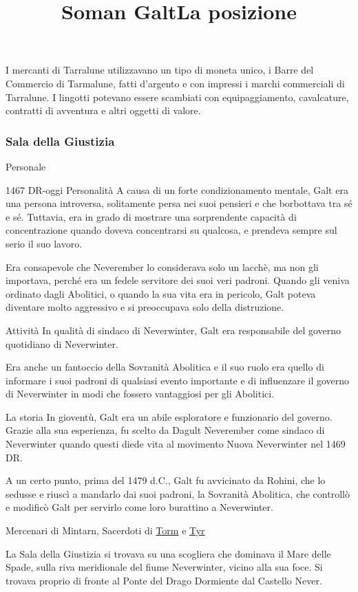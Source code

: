 \documentclass{article}
\begin{document}
I mercanti di Tarralune utilizzavano un tipo di moneta unico, i Barre del Commercio di Tarmalune, fatti d'argento e con impressi i marchi commerciali di Tarralune. I lingotti potevano essere scambiati con equipaggiamento, cavalcature, contratti di avventura e altri oggetti di valore.
\subsubsection{Sala della Giustizia}
Personale
\title{\textbf{Soman Galt}} 1467 DR-oggi\newline
Personalità
A causa di un forte condizionamento mentale, Galt era una persona introversa, solitamente persa nei suoi pensieri e che borbottava tra sé e sé. Tuttavia, era in grado di mostrare una sorprendente capacità di concentrazione quando doveva concentrarsi su qualcosa, e prendeva sempre sul serio il suo lavoro.

Era consapevole che Neverember lo considerava solo un lacchè, ma non gli importava, perché era un fedele servitore dei suoi veri padroni. Quando gli veniva ordinato dagli Abolitici, o quando la sua vita era in pericolo, Galt poteva diventare molto aggressivo e si preoccupava solo della distruzione.

Attività
In qualità di sindaco di Neverwinter, Galt era responsabile del governo quotidiano di Neverwinter.

Era anche un fantoccio della Sovranità Abolitica e il suo ruolo era quello di informare i suoi padroni di qualsiasi evento importante e di influenzare il governo di Neverwinter in modi che fossero vantaggiosi per gli Abolitici.

La storia
In gioventù, Galt era un abile esploratore e funzionario del governo. Grazie alla sua esperienza, fu scelto da Dagult Neverember come sindaco di Neverwinter quando questi diede vita al movimento Nuova Neverwinter nel 1469 DR.

A un certo punto, prima del 1479 d.C., Galt fu avvicinato da Rohini, che lo sedusse e riuscì a mandarlo dai suoi padroni, la Sovranità Abolitica, che controllò e modificò Galt per servirlo come loro burattino a Neverwinter.


Mercenari di Mintarn, Sacerdoti di \hyperlink{https://forgottenrealms.fandom.com/wiki/Torm}{Torm} e \hyperlink{https://forgottenrealms.fandom.com/wiki/Tyr}{Tyr}
\newline


\title{La posizione}\newline
La Sala della Giustizia si trovava su una scogliera che dominava il Mare delle Spade, sulla riva meridionale del fiume Neverwinter, vicino alla sua foce. Si trovava proprio di fronte al Ponte del Drago Dormiente dal Castello Never.
\end{document}
